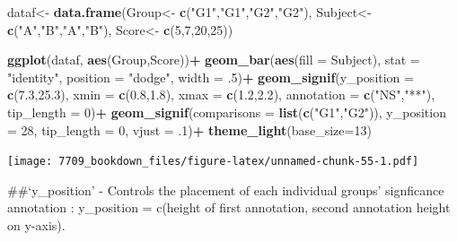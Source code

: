 \documentclass[]{book}
\newenvironment{Shaded}{\begin{snugshade}}{\end{snugshade}}
\newcommand{\DataTypeTok}[1]{\textcolor[rgb]{0.13,0.29,0.53}{#1}}
\newcommand{\DecValTok}[1]{\textcolor[rgb]{0.00,0.00,0.81}{#1}}
\newcommand{\FloatTok}[1]{\textcolor[rgb]{0.00,0.00,0.81}{#1}}
\newcommand{\KeywordTok}[1]{\textcolor[rgb]{0.13,0.29,0.53}{\textbf{#1}}}
\newcommand{\NormalTok}[1]{#1}
\newcommand{\OperatorTok}[1]{\textcolor[rgb]{0.81,0.36,0.00}{\textbf{#1}}}
\newcommand{\StringTok}[1]{\textcolor[rgb]{0.31,0.60,0.02}{#1}}
\begin{document}
\begin{Shaded}
\begin{Highlighting}[]
\NormalTok{dataf<-}\StringTok{ }\KeywordTok{data.frame}\NormalTok{(Group<-}\StringTok{ }\KeywordTok{c}\NormalTok{(}\StringTok{"G1"}\NormalTok{,}\StringTok{"G1"}\NormalTok{,}\StringTok{"G2"}\NormalTok{,}\StringTok{"G2"}\NormalTok{),}
\NormalTok{                   Subject<-}\StringTok{ }\KeywordTok{c}\NormalTok{(}\StringTok{"A"}\NormalTok{,}\StringTok{"B"}\NormalTok{,}\StringTok{"A"}\NormalTok{,}\StringTok{"B"}\NormalTok{),}
\NormalTok{                   Score<-}\StringTok{ }\KeywordTok{c}\NormalTok{(}\DecValTok{5}\NormalTok{,}\DecValTok{7}\NormalTok{,}\DecValTok{20}\NormalTok{,}\DecValTok{25}\NormalTok{))}

\KeywordTok{ggplot}\NormalTok{(dataf, }\KeywordTok{aes}\NormalTok{(Group,Score))}\OperatorTok{+}
\StringTok{  }\KeywordTok{geom_bar}\NormalTok{(}\KeywordTok{aes}\NormalTok{(}\DataTypeTok{fill =}\NormalTok{ Subject), }\DataTypeTok{stat =} \StringTok{"identity"}\NormalTok{, }
           \DataTypeTok{position =} \StringTok{"dodge"}\NormalTok{, }\DataTypeTok{width =} \FloatTok{.5}\NormalTok{)}\OperatorTok{+}
\StringTok{  }\KeywordTok{geom_signif}\NormalTok{(}\DataTypeTok{y_position =} \KeywordTok{c}\NormalTok{(}\FloatTok{7.3}\NormalTok{,}\FloatTok{25.3}\NormalTok{), }\DataTypeTok{xmin =} \KeywordTok{c}\NormalTok{(}\FloatTok{0.8}\NormalTok{,}\FloatTok{1.8}\NormalTok{), }
              \DataTypeTok{xmax =} \KeywordTok{c}\NormalTok{(}\FloatTok{1.2}\NormalTok{,}\FloatTok{2.2}\NormalTok{), }\DataTypeTok{annotation =} \KeywordTok{c}\NormalTok{(}\StringTok{"NS"}\NormalTok{,}\StringTok{"**"}\NormalTok{),}
              \DataTypeTok{tip_length =} \DecValTok{0}\NormalTok{)}\OperatorTok{+}
\StringTok{  }\KeywordTok{geom_signif}\NormalTok{(}\DataTypeTok{comparisons =} \KeywordTok{list}\NormalTok{(}\KeywordTok{c}\NormalTok{(}\StringTok{"G1"}\NormalTok{,}\StringTok{"G2"}\NormalTok{)), }\DataTypeTok{y_position =} \DecValTok{28}\NormalTok{,}
              \DataTypeTok{tip_length =} \DecValTok{0}\NormalTok{, }\DataTypeTok{vjust =} \FloatTok{.1}\NormalTok{)}\OperatorTok{+}
\StringTok{  }\KeywordTok{theme_light}\NormalTok{(}\DataTypeTok{base_size=}\DecValTok{13}\NormalTok{)}
\end{Highlighting}
\end{Shaded}

\texttt{[image: 7709\_bookdown\_files/figure-latex/unnamed-chunk-55-1.pdf]}

\#\#`y\_position'
- Controls the placement of each individual groups' signficance annotation : y\_position = c(height of first annotation, second annotation height on y-axis).
\end{document}
